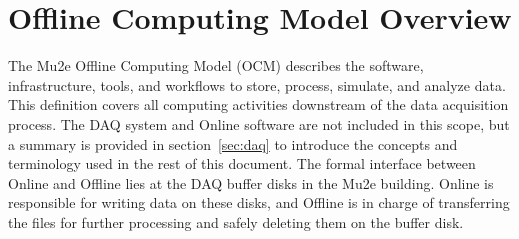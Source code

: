 \section{Offline Computing Model Overview}
\label{sec:overview}



The Mu2e Offline Computing Model (OCM) describes the software, infrastructure, tools, and workflows to store, process, simulate, and analyze data. This definition covers all computing activities downstream of the data acquisition process. The DAQ system and Online software are not included in this scope, but a summary is provided in section~\ref{sec:daq} to introduce the concepts and terminology used in the rest of this document. The formal interface between Online and Offline lies at the DAQ buffer disks in the Mu2e building. Online is responsible for writing data on these disks, and Offline is in charge of transferring the files for further processing and safely deleting them on the buffer disk. 

